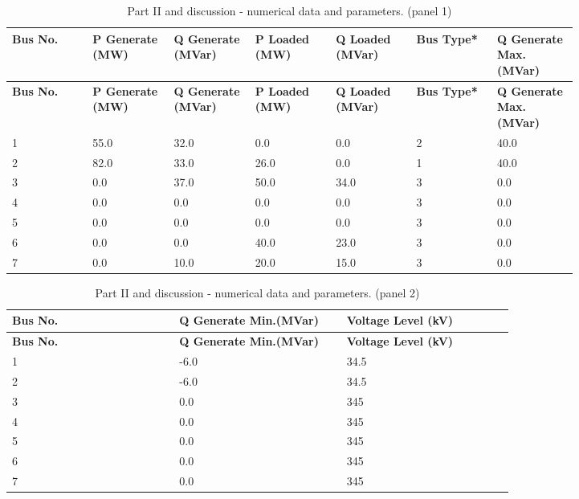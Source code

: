 \documentclass[11pt,a4paper]{article}
\begin{document}
\begingroup\small\setlength{\tabcolsep}{3pt}\renewcommand{\arraystretch}{1.18}\begin{longtable}{@{}p{0.1171\linewidth}p{0.1171\linewidth}p{0.1171\linewidth}p{0.1171\linewidth}p{0.1171\linewidth}p{0.1171\linewidth}p{0.1171\linewidth}@{}}
\caption{Part II and discussion - numerical data and parameters. (panel 1)}\label{tab:energy_assignment_p011_table10}\\\toprule
\textbf{Bus
No.} & \textbf{P
Generate
(MW)} & \textbf{Q
Generate
(MVar)} & \textbf{P
Loaded
(MW)} & \textbf{Q
Loaded
(MVar)} & \textbf{Bus
Type*} & \textbf{Q
Generate
Max.(MVar)} \\ \midrule\endfirsthead \textbf{Bus
No.} & \textbf{P
Generate
(MW)} & \textbf{Q
Generate
(MVar)} & \textbf{P
Loaded
(MW)} & \textbf{Q
Loaded
(MVar)} & \textbf{Bus
Type*} & \textbf{Q
Generate
Max.(MVar)} \\ \midrule\endhead
1 & 55.0 & 32.0 & 0.0 & 0.0 & 2 & 40.0 \\
2 & 82.0 & 33.0 & 26.0 & 0.0 & 1 & 40.0 \\
3 & 0.0 & 37.0 & 50.0 & 34.0 & 3 & 0.0 \\
4 & 0.0 & 0.0 & 0.0 & 0.0 & 3 & 0.0 \\
5 & 0.0 & 0.0 & 0.0 & 0.0 & 3 & 0.0 \\
6 & 0.0 & 0.0 & 40.0 & 23.0 & 3 & 0.0 \\
7 & 0.0 & 10.0 & 20.0 & 15.0 & 3 & 0.0 \\
\bottomrule\end{longtable}\endgroup
\begingroup\small\setlength{\tabcolsep}{3pt}\renewcommand{\arraystretch}{1.18}\begin{longtable}{@{}p{0.3000\linewidth}p{0.3000\linewidth}p{0.3000\linewidth}@{}}
\caption{Part II and discussion - numerical data and parameters. (panel 2)}\label{tab:energy_assignment_p011_table11}\\\toprule
\textbf{Bus
No.} & \textbf{Q
Generate
Min.(MVar)} & \textbf{Voltage
Level
(kV)} \\ \midrule\endfirsthead \textbf{Bus
No.} & \textbf{Q
Generate
Min.(MVar)} & \textbf{Voltage
Level
(kV)} \\ \midrule\endhead
1 & -6.0 & 34.5 \\
2 & -6.0 & 34.5 \\
3 & 0.0 & 345 \\
4 & 0.0 & 345 \\
5 & 0.0 & 345 \\
6 & 0.0 & 345 \\
7 & 0.0 & 345 \\
\bottomrule\end{longtable}\endgroup
\end{document}
